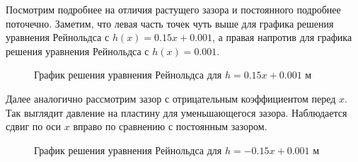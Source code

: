 \documentclass[a4paper,14pt]{extarticle}
\begin{document}
\newpage

Посмотрим подробнее на отличия растущего зазора и постоянного подробнее поточечно. Заметим, что левая часть точек чуть выше для графика решения уравнения Рейнольдса с  $h(x) = 0.15x + 0.001$, а правая напротив для графика решения уравнения Рейнольдса с $h(x) = 0.001$.

\begin{figure}[!htbp]
	\caption{График решения уравнения Рейнольдса для $h = 0.15 x + 0.001$ м}
	\label{pos_res_diff}
\end{figure}


Далее аналогично рассмотрим зазор с отрицательным коэффициентом перед $x$. Так выглядит давление на пластину для уменьшающегося зазора. Наблюдается сдвиг по оси $x$ вправо по сравнению с постоянным зазором.

\begin{figure}[!htbp]
	\caption{График решения уравнения Рейнольдса для $h = -0.15 x + 0.001$ м}
	\label{res_neg}
\end{figure}
\end{document}
